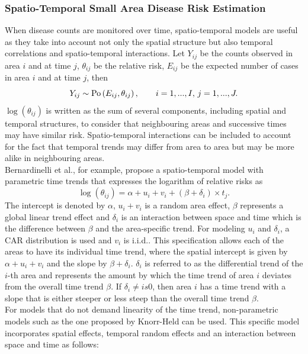\subsubsection{Spatio-Temporal Small Area Disease Risk Estimation}
When disease counts are monitored over time, spatio-temporal models are useful as they take into account not only the spatial structure but also temporal correlations and spatio-temporal interactions. Let $Y_{ij}$ be the counts observed in area $i$ and at time $j$, $\theta_{ij}$ be the relative risk, $E_{ij}$ be the expected number of cases in area $i$ and at time $j$, then
\begin{equation}
    Y_{ij}\sim\hbox{Po}\left(E_{ij}, \theta_{ij}\right), \hspace{20pt} i=1,...,I,\,j=1,...,J.
\end{equation}
$\log\left(\theta_{ij}\right)$ is written as the sum of several components, including spatial and temporal structures, to consider that neighbouring areas and successive times may have similar risk. Spatio-temporal interactions can be included to account for the fact that temporal trends may differ from area to area but may be more alike in neighbouring areas. \\
Bernardinelli et al.\autocite[Cf.][]{bernardinelli1995bayesian}, for example, propose a spatio-temporal model with parametric time trends that expresses the logarithm of relative risks as
\begin{equation}
    \log\left(\theta_{ij}\right)=\alpha+u_i+v_i+ \left(\beta+\delta_i\right)\times t_j.
\end{equation}
The intercept is denoted by $\alpha$, $u_i+v_i$ is a random area effect, $\beta$ represents a global linear trend effect and $\delta_i$ is an interaction between space and time which is the difference between $\beta$ and the area-specific trend. For modeling $u_i$ and $\delta_i$, a CAR distribution is used and $v_i$ is i.i.d.. This specification allows each of the areas to have its individual time trend, where the spatial intercept is given by $\alpha+u_i+v_i$ and the slope by $\beta+\delta_i$. $\delta_i$ is referred to as the differential trend of the $i$-th area and represents the amount by which the time trend of area $i$ deviates from the overall time trend $\beta$. If $\delta_i\neq is 0$, then area $i$ has a time trend with a slope that is either steeper or less steep than the overall time trend $\beta$. \\
For models that do not demand linearity of the time trend, non-parametric models such as the one proposed by Knorr-Held\autocite[Cf.][]{knorr2000bayesian} can be used. This specific model incorporates spatial effects, temporal random effects and an interaction between space and time as follows:
